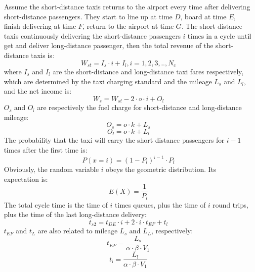 Assume the short-distance taxis returns to the airport every time after delivering short-distance passengers. They start to line up at time $D$, board at time $E$, finish delivering at time $F$, return to the airport at time $G$. The short-distance taxis continuously delivering the short-distance passengers $i$ times in a cycle until get and deliver long-distance passenger, then the total revenue of the short-distance taxis is:
\begin{equation}
	W_{st} = I_{s} \cdot i + I_{l}, i = 1,2,3,..,N_{c}
\label{W_st}
\end{equation}
where $I_{s}$ and $I_{l}$ are the short-distance and long-distance taxi fares respectively, which are determined by the taxi charging standard and the mileage $L_{s}$ and $L_{l}$, and the net income is:
\begin{equation}
	W_{s} = W_{st} - 2 \cdot o \cdot i + O_{l}
\label{W_s}
\end{equation}
$O_{s}$ and $O_{l}$ are respectively the fuel charge for short-distance and long-distance mileage:
\begin{equation}
	O_{s} = o \cdot k + L_{s}
\label{O_s}
\end{equation}
\begin{equation}
	O_{l} = o \cdot k + L_{l}
\label{O_l}
\end{equation}
The probability that the taxi will carry the short distance passengers for $i-1$ times after the first time is:
\begin{equation}
	P(x = i)=(1-P_{l})^{i-1}\cdot P_{l}
\label{P_i}
\end{equation}
Obviously, the random variable $i$ obeys the geometric distribution. Its expectation is:
\begin{equation}
	E(X)=\frac{1}{P_{l}}
\label{E_X}
\end{equation}
The total cycle time is the time of $i$ times queues, plus the time of $i$ round trips, plus the time of the last long-distance delivery:
\begin{equation}
	t_{s2} = t_{DE} \cdot i + 2 \cdot i \cdot t_{EF} + t_{l}
\label{t_s2}
\end{equation}
$t_{EF}$ and $t_{L}$ are also related to mileage $L_{s}$ and $L_{L}$, respectively:
\begin{equation}
	t_{EF} = \frac{L_{s}}{\alpha \cdot \beta \cdot V_{1}}
\label{t_EF}
\end{equation}
\begin{equation}
	t_{l} = \frac{L_{l}}{\alpha \cdot \beta \cdot V_{1}}
\label{t_l}
\end{equation}
